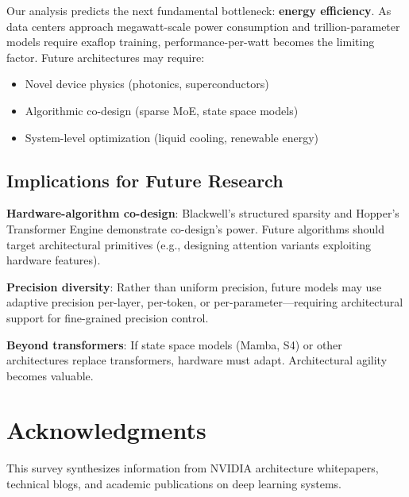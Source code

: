 \documentclass{article}
\begin{document}
Our analysis predicts the next fundamental bottleneck: \textbf{energy efficiency}. As data centers approach megawatt-scale power consumption and trillion-parameter models require exaflop training, performance-per-watt becomes the limiting factor. Future architectures may require:
\begin{itemize}
\item Novel device physics (photonics, superconductors)
\item Algorithmic co-design (sparse MoE, state space models)
\item System-level optimization (liquid cooling, renewable energy)
\end{itemize}

\subsection{Implications for Future Research}

\textbf{Hardware-algorithm co-design}: Blackwell's structured sparsity and Hopper's Transformer Engine demonstrate co-design's power. Future algorithms should target architectural primitives (e.g., designing attention variants exploiting hardware features).

\textbf{Precision diversity}: Rather than uniform precision, future models may use adaptive precision per-layer, per-token, or per-parameter---requiring architectural support for fine-grained precision control.

\textbf{Beyond transformers}: If state space models (Mamba, S4) or other architectures replace transformers, hardware must adapt. Architectural agility becomes valuable.

\section*{Acknowledgments}

This survey synthesizes information from NVIDIA architecture whitepapers, technical blogs, and academic publications on deep learning systems.



\end{document}
